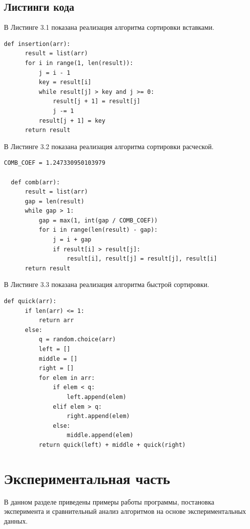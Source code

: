 \documentclass[a4paper,12pt]{report}
\begin{document}
\section{Листинги кода}

\hspace{0.6cm}В Листинге 3.1 показана реализация алгоритма сортировки вставками.

\begin{lstlisting}[caption=Функция сортировки вставками]
  def insertion(arr):
      result = list(arr)
      for i in range(1, len(result)):
          j = i - 1
          key = result[i]
          while result[j] > key and j >= 0:
              result[j + 1] = result[j]
              j -= 1
          result[j + 1] = key
      return result
\end{lstlisting}
\newpage
В Листинге 3.2 показана реализация алгоритма сортировки расческой.
\begin{lstlisting}[caption=Функция сортировки расческой]
  COMB_COEF = 1.247330950103979
  
  def comb(arr):
      result = list(arr)
      gap = len(result)
      while gap > 1:
          gap = max(1, int(gap / COMB_COEF))
          for i in range(len(result) - gap):
              j = i + gap
              if result[i] > result[j]:
                  result[i], result[j] = result[j], result[i]
      return result
\end{lstlisting}

В Листинге 3.3 показана реализация алгоритма быстрой сортировки.
\begin{lstlisting}[caption=Функция быстрой сортировки]
  def quick(arr):
      if len(arr) <= 1:
          return arr
      else:
          q = random.choice(arr)
          left = []
          middle = []
          right = []
          for elem in arr:
              if elem < q:
                  left.append(elem)
              elif elem > q:
                  right.append(elem)
              else:
                  middle.append(elem)
          return quick(left) + middle + quick(right)
\end{lstlisting}



\chapter{Экспериментальная часть}
В данном разделе приведены примеры работы программы, постановка эксперимента и сравнительный анализ алгоритмов на основе экспериментальных данных.
\end{document}
